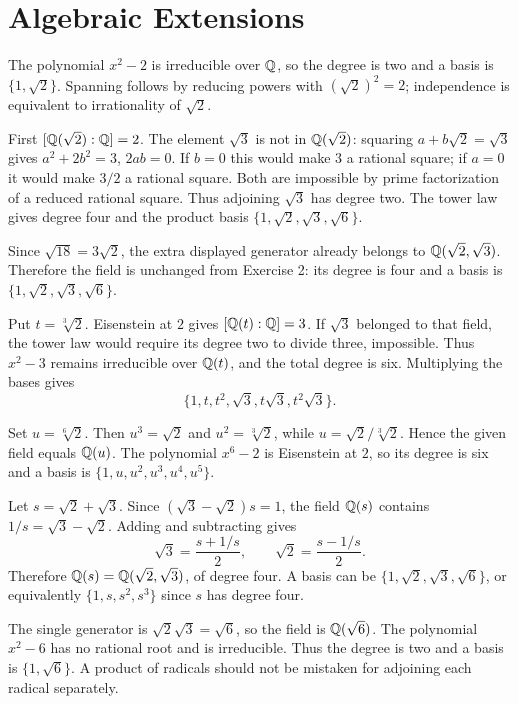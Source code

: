 \section{Algebraic Extensions}

The polynomial $x^2-2$ is irreducible over $\mathbb{Q}$, so the degree is two and a basis is $\{1,\sqrt2\}$. Spanning follows by reducing powers with $(\sqrt2)^2=2$; independence is equivalent to irrationality of $\sqrt2$.

First $[\mathbb{Q}(\sqrt2):\mathbb{Q}]=2$. The element $\sqrt3$ is not in $\mathbb{Q}(\sqrt2)$: squaring $a+b\sqrt2=\sqrt3$ gives $a^2+2b^2=3$, $2ab=0$. If $b=0$ this would make $3$ a rational square; if $a=0$ it would make $3/2$ a rational square. Both are impossible by prime factorization of a reduced rational square.
Thus adjoining $\sqrt3$ has degree two. The tower law gives degree four and the product basis $\{1,\sqrt2,\sqrt3,\sqrt6\}$.

Since $\sqrt{18}=3\sqrt2$, the extra displayed generator already belongs to $\mathbb{Q}(\sqrt2,\sqrt3)$. Therefore the field is unchanged from Exercise 2: its degree is four and a basis is $\{1,\sqrt2,\sqrt3,\sqrt6\}$.

Put $t=\sqrt[3]2$. Eisenstein at $2$ gives $[\mathbb{Q}(t):\mathbb{Q}]=3$. If $\sqrt3$ belonged to that field, the tower law would require its degree two to divide three, impossible. Thus $x^2-3$ remains irreducible over $\mathbb{Q}(t)$, and the total degree is six. Multiplying the bases gives
\[\{1,t,t^2,\sqrt3,t\sqrt3,t^2\sqrt3\}.\]

Set $u=\sqrt[6]2$. Then $u^3=\sqrt2$ and $u^2=\sqrt[3]2$, while $u=\sqrt2/\sqrt[3]2$. Hence the given field equals $\mathbb{Q}(u)$. The polynomial $x^6-2$ is Eisenstein at $2$, so its degree is six and a basis is $\{1,u,u^2,u^3,u^4,u^5\}$.

Let $s=\sqrt2+\sqrt3$. Since $(\sqrt3-\sqrt2)s=1$, the field $\mathbb{Q}(s)$ contains $1/s=\sqrt3-\sqrt2$. Adding and subtracting gives
\[\sqrt3=\frac{s+1/s}{2},\qquad\sqrt2=\frac{s-1/s}{2}.\]
Therefore $\mathbb{Q}(s)=\mathbb{Q}(\sqrt2,\sqrt3)$, of degree four. A basis can be $\{1,\sqrt2,\sqrt3,\sqrt6\}$, or equivalently $\{1,s,s^2,s^3\}$ since $s$ has degree four.

The single generator is $\sqrt2\sqrt3=\sqrt6$, so the field is $\mathbb{Q}(\sqrt6)$. The polynomial $x^2-6$ has no rational root and is irreducible. Thus the degree is two and a basis is $\{1,\sqrt6\}$. A product of radicals should not be mistaken for adjoining each radical separately.

